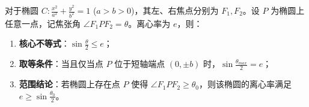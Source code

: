 \begin{statementbox}
对于椭圆 $C: \frac{x^2}{a^2} + \frac{y^2}{b^2} = 1$ ($a>b>0$)，其左、右焦点分别为 $F_1, F_2$。设 $P$ 为椭圆上任意一点，记焦张角 $\angle F_1PF_2 = \theta$。离心率为 $e$，则：
\begin{enumerate}
    \item \textbf{核心不等式}：$\sin \frac{\theta}{2} \le e$；
    \item \textbf{取等条件}：当且仅当点 $P$ 位于短轴端点 $(0, \pm b)$ 时，$\sin \frac{\theta_{max}}{2} = e$；
    \item \textbf{范围结论}：若椭圆上存在点 $P$ 使得 $\angle F_1PF_2 \ge \theta_0$，则该椭圆的离心率满足 $e \ge \sin \frac{\theta_0}{2}$。
\end{enumerate}
\end{statementbox}